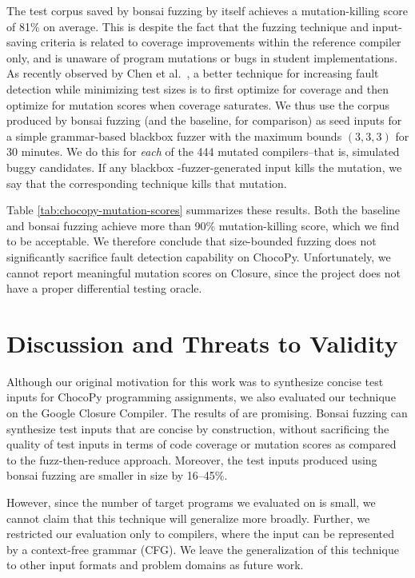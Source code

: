 \documentclass[conference]{IEEEtran}
\newcommand{\tech}{bonsai fuzzing} \newcommand{\Tech}{Bonsai fuzzing} \newcommand{\TECH}{Bonsai Fuzzing}
\begin{document}
The test corpus saved by \tech{} by itself achieves a mutation-killing score of 81\% on average. This is despite the fact that the fuzzing technique and input-saving criteria is related to coverage improvements within the reference compiler only, and is unaware of program mutations or bugs in student implementations.
As recently observed by Chen et al.~\cite{Chen20}, a better technique for increasing fault detection while minimizing test sizes is to first optimize for coverage and then optimize for mutation scores when coverage saturates. We thus use the corpus produced by \tech{} (and the baseline, for comparison) as seed inputs for a simple grammar-based blackbox fuzzer with the maximum bounds $(3,3,3)$ for 30 minutes. We do this for \emph{each} of the 444 mutated compilers--that is, simulated buggy candidates. If any blackbox -fuzzer-generated input kills the mutation, we say that the corresponding technique kills that mutation. 





Table \ref{tab:chocopy-mutation-scores} summarizes these results. Both the baseline and \tech{} achieve more than 90\% mutation-killing score, which we find to be acceptable. We therefore conclude that size-bounded fuzzing does not significantly sacrifice fault detection capability on ChocoPy.
Unfortunately, we cannot report meaningful mutation scores on Closure, since the project does not have a proper differential testing oracle.




 \section{Discussion and Threats to Validity}


Although our original motivation for this work was to synthesize concise test inputs for ChocoPy programming assignments, we also evaluated our technique on the Google Closure Compiler. 
The results of are promising. \Tech{} can synthesize test inputs that are concise by construction, without sacrificing the quality of test inputs in terms of code coverage or mutation scores as compared to the fuzz-then-reduce approach. Moreover, the test inputs produced using \tech{} are smaller in size by 16--45\%. 

However, since the number of target programs we evaluated on is small, we cannot claim that this technique will generalize more broadly. Further, we restricted our evaluation only to compilers, where the input can be represented by a context-free grammar (CFG). We leave the generalization of this technique to other input formats and problem domains as future work.
\end{document}

